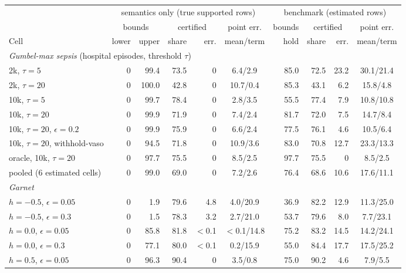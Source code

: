 \setlength{\tabcolsep}{3pt}%
\begin{tabular}{lrrrrcrrrc}
\toprule
 & \multicolumn{5}{c}{semantics only (true supported rows)} & \multicolumn{4}{c}{benchmark (estimated rows)} \\
\cmidrule(lr){2-6}\cmidrule(lr){7-10}
 & \multicolumn{2}{c}{bounds} & \multicolumn{2}{c}{certified} & point err. & bounds & \multicolumn{2}{c}{certified} & point err. \\
\cmidrule(lr){2-3}\cmidrule(lr){4-5}\cmidrule(lr){6-6}\cmidrule(lr){7-7}\cmidrule(lr){8-9}\cmidrule(lr){10-10}
Cell & lower & upper & share & err. & mean/term & hold & share & err. & mean/term \\
\midrule
\multicolumn{10}{l}{\textit{Gumbel-max sepsis} (hospital episodes, threshold $\tau$)} \\
2k, $\tau{=}5$ & 0 & 99.4 & 73.5 & 0 & 6.4/2.9 & 85.0 & 72.5 & 23.2 & 30.1/21.4 \\
2k, $\tau{=}20$ & 0 & 100.0 & 42.8 & 0 & 10.7/0.4 & 85.3 & 43.1 & 6.2 & 15.8/4.8 \\
10k, $\tau{=}5$ & 0 & 99.7 & 78.4 & 0 & 2.8/3.5 & 55.5 & 77.4 & 7.9 & 10.8/10.8 \\
10k, $\tau{=}20$ & 0 & 99.9 & 71.9 & 0 & 7.4/2.4 & 81.7 & 72.0 & 7.5 & 14.7/8.4 \\
10k, $\tau{=}20$, $\epsilon{=}0.2$ & 0 & 99.9 & 75.9 & 0 & 6.6/2.4 & 77.5 & 76.1 & 4.6 & 10.5/6.4 \\
10k, $\tau{=}20$, withhold-vaso & 0 & 94.5 & 71.8 & 0 & 10.9/3.6 & 83.0 & 70.8 & 12.7 & 23.3/13.3 \\
oracle, 10k, $\tau{=}20$ & 0 & 97.7 & 75.5 & 0 & 8.5/2.5 & 97.7 & 75.5 & 0 & 8.5/2.5 \\
pooled (6 estimated cells) & 0 & 99.0 & 69.0 & 0 & 7.2/2.6 & 76.4 & 68.6 & 10.6 & 17.6/11.1 \\
\midrule
\multicolumn{10}{l}{\textit{Garnet}} \\
$h{=}{-}0.5$, $\epsilon{=}0.05$ & 0 & 1.9 & 79.6 & 4.8 & 4.0/20.9 & 36.9 & 82.2 & 12.9 & 11.3/25.0 \\
$h{=}{-}0.5$, $\epsilon{=}0.3$ & 0 & 1.5 & 78.3 & 3.2 & 2.7/21.0 & 53.7 & 79.6 & 8.0 & 7.7/23.1 \\
$h{=}0.0$, $\epsilon{=}0.05$ & 0 & 85.8 & 81.8 & $<$0.1 & $<$0.1/14.8 & 75.2 & 83.2 & 14.5 & 14.2/24.1 \\
$h{=}0.0$, $\epsilon{=}0.3$ & 0 & 77.1 & 80.0 & $<$0.1 & 0.2/15.9 & 55.0 & 84.4 & 17.7 & 17.5/25.2 \\
$h{=}0.5$, $\epsilon{=}0.05$ & 0 & 96.3 & 90.4 & 0 & 3.5/0.8 & 75.0 & 90.2 & 4.6 & 7.9/5.5 \\

\end{tabular}
